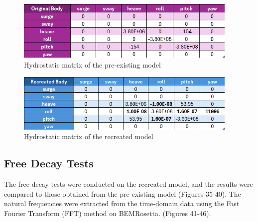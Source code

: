 \documentclass[a4paper, 11pt]{article}
\begin{document}
\begin{figure}[H]
    \centering
    \includegraphics[width=0.95\textwidth]{hyd_st_org.png}
    \caption{\small Hydrostatic matrix of the pre-existing model}
    \label{fig:hyd_st_org}
\end{figure}

\begin{figure}[H]
    \centering
    \includegraphics[width=0.95\textwidth]{hyd_st_re.png}
    \caption{\small Hydrostatic matrix of the recreated model}
    \label{fig:hyd_st_re}
\end{figure}

\subsection{Free Decay Tests}
\hspace*{0.5cm}The free decay tests were conducted on the recreated model, and the results were compared to those obtained from the pre-existing model (Figures 35-40). The natural frequencies were extracted from the time-domain data using the Fast Fourier Transform (FFT) method on BEMRosetta. (Figures 41-46). 
\end{document}
